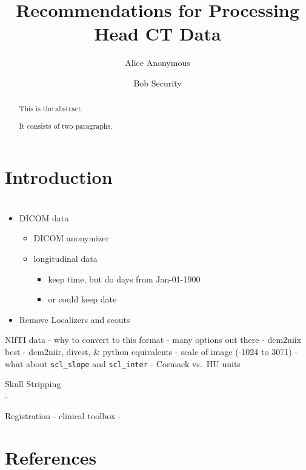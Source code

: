 \documentclass[]{elsarticle} %
\providecommand{\tightlist}{%
  \setlength{\itemsep}{0pt}\setlength{\parskip}{0pt}}
\begin{document}
\begin{frontmatter}

  \title{Recommendations for Processing Head CT Data}
    \author[Some Institute of Technology]{Alice Anonymous}
    \author[Another University]{Bob Security}
  
      \address[Some Institute of Technology]{Department, Street, City, State, Zip}
    \address[Another University]{Department, Street, City, State, Zip}
  
  \begin{abstract}
  This is the abstract.
  
  It consists of two paragraphs.
  \end{abstract}
  
 \end{frontmatter}

\hypertarget{introduction}{%
\section{Introduction}\label{introduction}}

\hypertarget{section}{%
\section{}\label{section}}

\begin{itemize}
\tightlist
\item
  DICOM data

  \begin{itemize}
  \tightlist
  \item
    DICOM anonymizer
  \item
    longitudinal data

    \begin{itemize}
    \tightlist
    \item
      keep time, but do days from Jan-01-1900
    \item
      or could keep date
    \end{itemize}
  \end{itemize}
\item
  Remove Localizers and scouts
\end{itemize}

NIfTI data - why to convert to this format - many options out there -
dcm2niix best - dcm2niir, divest, \& python equivalents - scale of image
(-1024 to 3071) - what about \texttt{scl\_slope} and \texttt{scl\_inter}
- Cormack vs.~HU units

Skull Stripping\\
-

Registration - clinical toolbox -

\hypertarget{references}{%
\section*{References}\label{references}}
\end{document}
